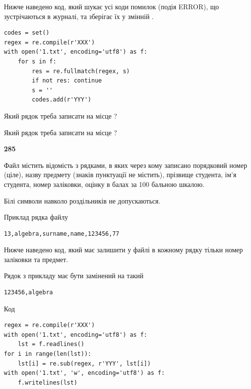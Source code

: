 Нижче наведено код, який шукає усі коди помилок (подія ERROR), що зустріча\-ють\-ся в журналі, та зберігає їх у змінній .



\begin{verbatim}
codes = set()
regex = re.compile(r'XXX')
with open('1.txt', encoding='utf8') as f:
    for s in f:
        res = re.fullmatch(regex, s)
        if not res: continue
        s = ''
        codes.add(r'YYY')
\end{verbatim}





Який рядок треба записати на місце  ?\par
\vspace{5mm}


Який рядок треба записати на місце  ?\par


\newpage

{\begin {center}\textbf{ 285}\end {center}}\par
Файл  містить відомість з рядками, в яких через кому записано поряд\-ковий номер (ціле), назву предмету (знаків пунктуації не містить), прізвище студента, ім'я студента, номер заліковки, оцінку в балах за 100 бальною шкалою.

Білі символи навколо роздільників не допускаються.

Приклад рядка файлу



\begin{verbatim}
13,algebra,surname,name,123456,77
\end{verbatim}


Нижче наведено код, який має залишити у файлі в кожному рядку тільки номер заліковки та предмет.

Рядок з прикладу має бути замінений на такий



\begin{verbatim}
123456,algebra
\end{verbatim}




Код



\begin{verbatim}
regex = re.compile(r'XXX')
with open('1.txt', encoding='utf8') as f:
    lst = f.readlines()
for i in range(len(lst)):
    lst[i] = re.sub(regex, r'YYY', lst[i])
with open('1.txt', 'w', encoding='utf8') as f:
    f.writelines(lst)
\end{verbatim}









